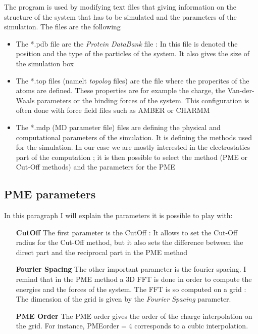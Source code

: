 \documentclass[12pt,twoside,a4paper]{report}
\begin{document}
	 The program is used  by modifying text files that giving information on the structure of the system that has to be simulated and the parameters of the simulation. The files are the following 
	 
	\begin{itemize}
	
	\item The *.pdb file are the \textit{Protein DataBank} file : In this file is denoted the position and the type of the particles of the system. It also gives the size of the simulation box

	\item The *.top files (namelt \textit{topoloy} files) are the file where the properites of the atoms are defined. These properties are for example the charge, the Van-der-Waals parameters or the binding forces of the system. This configuration is often done with force field files such as AMBER or CHARMM
		 
	\item The *.mdp (MD parameter file) files are defining the physical and computational parameters of the simulation. It is defining the methods used for the simulation. In our case we are mostly interested in the electrostatics part of the computation ; it is then possible to select the method (PME or Cut-Off methods) and the parameters for the PME
	
	\end{itemize}
		
	\subsection{PME parameters}
	
	In this paragraph I will explain the parameters it is possible to play with:
	
	\begin{enumerate}
	

	\item[\textbf{CutOff}] The first parameter is the CutOff : It allows to set the Cut-Off radius for the Cut-Off method, but it also sets the difference between the direct part and the reciprocal part in the PME method
	
	\item[\textbf{Fourier Spacing}] The other important parameter is the fourier spacing. I remind that in the PME method a 3D FFT is done in order to compute the energies and the forces of the system. The FFT is so computed on a grid : The dimension of the grid is given by the \textit{Fourier Spacing} parameter.
	
	\item[\textbf{PME Order}] The PME order gives the order of the charge interpolation on the grid. For instance, PMEorder$= 4$ corresponds to a cubic interpolation. 		
	
	\end{enumerate}
	
\end{document}

